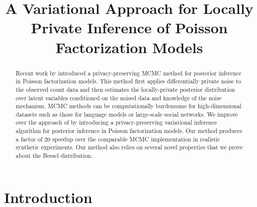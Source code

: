 \documentclass[letterpaper]{article}
\title{A Variational Approach for Locally Private Inference of Poisson Factorization Models}
\author{} %
\begin{document}
\maketitle

\begin{abstract}
    Recent work by \citet{schein2018locally} introduced a privacy-preserving MCMC method for posterior inference in Poisson factorization models. This method first applies differentially private noise to the observed count data and then estimates the locally-private posterior distribution over latent variables conditioned on the noised data and knowledge of the noise mechanism. MCMC methods can be computationally burdensome for high-dimensional datasets such as those for language models or large-scale social networks. We improve over the approach of \citet{schein2018locally} by introducing a privacy-preserving variational inference algorithm for posterior inference in Poisson factorization models. Our method produces a factor of 20 speedup over the comparable MCMC
    implementation in realistic synthetic experiments. Our method also relies on several novel properties that we prove about the Bessel distribution.~
  \end{abstract}

  \section{Introduction}
  
\end{document}
